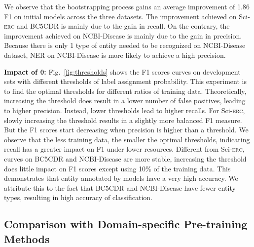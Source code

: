 \documentclass[10pt, conference, compsocconf]{IEEEtran}
\newcommand{\Scierc}{\textsc{S}ci-\textsc{erc}\xspace}
\newcommand{\Vtheta}{\boldsymbol{\theta}}
\begin{document}
We observe that the bootstrapping process gains an average improvement of 1.86 F1 on initial models across the three datasets. 
The improvement achieved on \Scierc and BC5CDR is mainly due to the gain in recall.
On the contrary, the improvement achieved on NCBI-Disease is mainly due to the gain in precision.
Because there is only 1 type of entity needed to be recognized on NCBI-Disease dataset,
NER on NCBI-Disease is more likely to achieve a high precision.
\begin{figure*}[tb]
    \centering
    \subfigure[\Scierc]{ \texttt{[image: ./figures/SciERC.pdf]}}

    \caption{F1 scores curves on development set vs. thresholds of label assignment
    probability.}
    \label{fig:thresholds}
\end{figure*}




\textbf{Impact of $\Vtheta$:}
Fig.~\ref{fig:thresholds} shows the F1 scores curves on development sets with different thresholds
of label assignment probability. 
This experiment is to find the optimal thresholds
for different ratios of training data.
Theoretically, increasing the threshold does result in a lower number of false positives, leading to 
higher precision. Instead, lower thresholds lead to higher recalls. 
For \Scierc, slowly increasing the threshold results in a slightly more balanced F1 measure.
But the F1 scores start decreasing when precision is higher than a threshold.
We observe that the less training data, the smaller the optimal thresholds, indicating recall 
has a greater impact on F1 under lower resources. Different from \Scierc, curves on BC5CDR and NCBI-Disease are more stable, 
increasing the threshold does little impact on F1 scores except using 10\% of the training data. 
This demonstrates that entity annotated by models have a very high accuracy.
We attribute this to the fact that BC5CDR and NCBI-Disease have fewer entity types,
resulting in high accuracy of classification.

\subsection{Comparison with Domain-specific Pre-training Methods}
\end{document}
